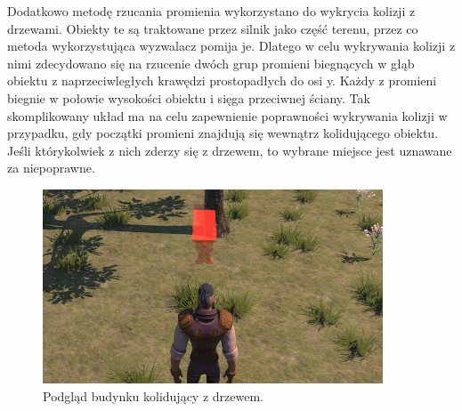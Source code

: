 Dodatkowo metodę rzucania promienia wykorzystano do wykrycia kolizji z drzewami. Obiekty te są traktowane przez silnik
jako część terenu, przez co metoda wykorzystująca wyzwalacz pomija je. Dlatego w celu wykrywania kolizji z nimi
zdecydowano się na rzucenie dwóch grup promieni biegnących w głąb obiektu z naprzeciwległych krawędzi prostopadłych do
osi y. Każdy z promieni biegnie w połowie wysokości obiektu i sięga przeciwnej ściany. Tak skomplikowany układ ma na
celu zapewnienie poprawności wykrywania kolizji w przypadku, gdy początki promieni znajdują się wewnątrz kolidującego
obiektu. Jeśli którykolwiek z nich zderzy się z drzewem, to wybrane miejsce jest uznawane za niepoprawne.

\begin{figure}[h!]
    \centering
    \includegraphics[width=0.9\textwidth]{images/implementacja/mechanizm_budowania/kolizja_drzewo.png}
    \caption{Podgląd budynku kolidujący z drzewem.}
\end{figure}

